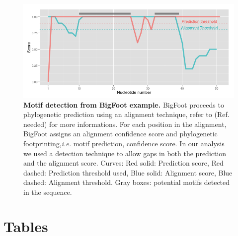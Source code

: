 \documentclass[10pt]{article}
\begin{document}
\begin{figure}[!ht]
\begin{center}
\includegraphics[scale=0.6]{Figures/ScoresPlot.png}
\end{center}
\caption{
{\bf Motif detection from BigFoot example.} BigFoot proceeds to phylogenetic prediction using an alignment technique, refer to (Ref. needed) for more informations. For each position in the alignment, BigFoot assigns an alignment confidence score and phylogenetic footprinting,\textit{i.e.} motif prediction, confidence score. In our analysis we used a detection technique to allow gaps in both the prediction and the alignment score. Curves: Red solid: Prediction score, Red dashed: Prediction threshold used, Blue solid: Alignment score, Blue dashed: Alignment threshold. Gray boxes: potential motifs detected in the sequence.
}
\label{fig:Scores}
\end{figure}


\section*{Tables}
\end{document}
